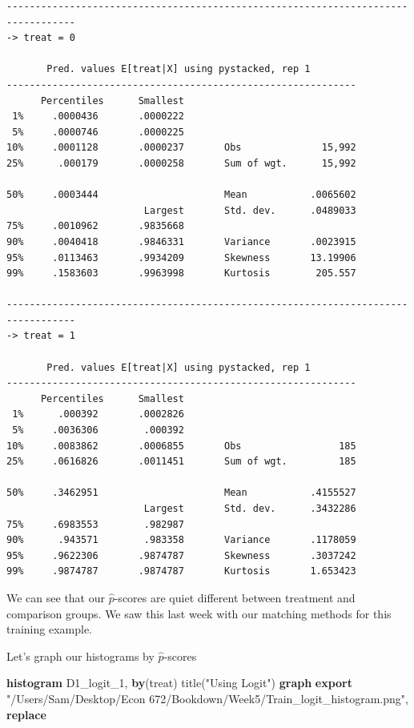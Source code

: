 \documentclass[
]{book}
\newenvironment{Shaded}{\begin{snugshade}}{\end{snugshade}}
\newcommand{\BaseNTok}[1]{\textcolor[rgb]{0.00,0.00,0.81}{#1}}
\newcommand{\KeywordTok}[1]{\textcolor[rgb]{0.13,0.29,0.53}{\textbf{#1}}}
\newcommand{\NormalTok}[1]{#1}
\newcommand{\StringTok}[1]{\textcolor[rgb]{0.31,0.60,0.02}{#1}}
\begin{document}
\begin{verbatim}
----------------------------------------------------------------------------------
-> treat = 0

       Pred. values E[treat|X] using pystacked, rep 1
-------------------------------------------------------------
      Percentiles      Smallest
 1%     .0000436       .0000222
 5%     .0000746       .0000225
10%     .0001128       .0000237       Obs              15,992
25%      .000179       .0000258       Sum of wgt.      15,992

50%     .0003444                      Mean           .0065602
                        Largest       Std. dev.      .0489033
75%     .0010962       .9835668
90%     .0040418       .9846331       Variance       .0023915
95%     .0113463       .9934209       Skewness       13.19906
99%     .1583603       .9963998       Kurtosis        205.557

----------------------------------------------------------------------------------
-> treat = 1

       Pred. values E[treat|X] using pystacked, rep 1
-------------------------------------------------------------
      Percentiles      Smallest
 1%      .000392       .0002826
 5%     .0036306        .000392
10%     .0083862       .0006855       Obs                 185
25%     .0616826       .0011451       Sum of wgt.         185

50%     .3462951                      Mean           .4155527
                        Largest       Std. dev.      .3432286
75%     .6983553        .982987
90%      .943571        .983358       Variance       .1178059
95%     .9622306       .9874787       Skewness       .3037242
99%     .9874787       .9874787       Kurtosis       1.653423
\end{verbatim}

We can see that our \(\hat{p}\)-scores are quiet different between treatment and comparison groups. We saw this last week with our matching methods for this training example.

Let's graph our histograms by \(\hat{p}\)-scores

\begin{Shaded}
\begin{Highlighting}[]
\KeywordTok{histogram}\NormalTok{ D1\_logit\_1, }\KeywordTok{by}\NormalTok{(treat) }\BaseNTok{title}\NormalTok{(}\StringTok{"Using Logit"}\NormalTok{)}
\KeywordTok{graph} \KeywordTok{export} \StringTok{"/Users/Sam/Desktop/Econ 672/Bookdown/Week5/Train\_logit\_histogram.png"}\NormalTok{, }\KeywordTok{replace}
\end{Highlighting}
\end{Shaded}
\end{document}
